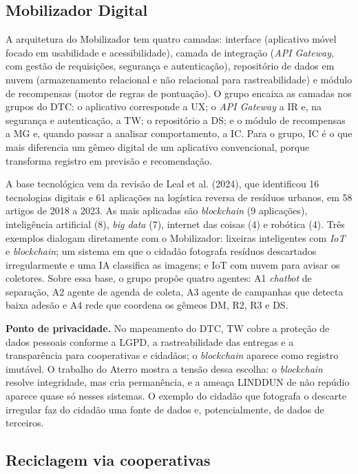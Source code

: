 \documentclass[12pt,a4paper,article,oneside,english,brazil]{abntex2}
\begin{document}
\subsection{Mobilizador Digital}

A arquitetura do Mobilizador tem quatro camadas: interface (aplicativo móvel focado em usabilidade e acessibilidade), camada de integração (\textit{API Gateway}, com gestão de requisições, segurança e autenticação), repositório de dados em nuvem (armazenamento relacional e não relacional para rastreabilidade) e módulo de recompensas (motor de regras de pontuação). O grupo encaixa as camadas nos grupos do DTC: o aplicativo corresponde a UX; o \textit{API Gateway} a IR e, na segurança e autenticação, a TW; o repositório a DS; e o módulo de recompensas a MG e, quando passar a analisar comportamento, a IC. Para o grupo, IC é o que mais diferencia um gêmeo digital de um aplicativo convencional, porque transforma registro em previsão e recomendação.

A base tecnológica vem da revisão de Leal et al. (2024), que identificou 16 tecnologias digitais e 61 aplicações na logística reversa de resíduos urbanos, em 58 artigos de 2018 a 2023. As mais aplicadas são \textit{blockchain} (9 aplicações), inteligência artificial (8), \textit{big data} (7), internet das coisas (4) e robótica (4). Três exemplos dialogam diretamente com o Mobilizador: lixeiras inteligentes com \textit{IoT} e \textit{blockchain}; um sistema em que o cidadão fotografa resíduos descartados irregularmente e uma IA classifica as imagens; e IoT com nuvem para avisar os coletores. Sobre essa base, o grupo propõe quatro agentes: A1 \textit{chatbot} de separação, A2 agente de agenda de coleta, A3 agente de campanhas que detecta baixa adesão e A4 rede que coordena os gêmeos DM, R2, R3 e DS.

\textbf{Ponto de privacidade.} No mapeamento do DTC, TW cobre a proteção de dados pessoais conforme a LGPD, a rastreabilidade das entregas e a transparência para cooperativas e cidadãos; o \textit{blockchain} aparece como registro imutável. O trabalho do Aterro mostra a tensão dessa escolha: o \textit{blockchain} resolve integridade, mas cria permanência, e a ameaça LINDDUN de não repúdio aparece quase só nesses sistemas. O exemplo do cidadão que fotografa o descarte irregular faz do cidadão uma fonte de dados e, potencialmente, de dados de terceiros.

\subsection{Reciclagem via cooperativas}
\end{document}
